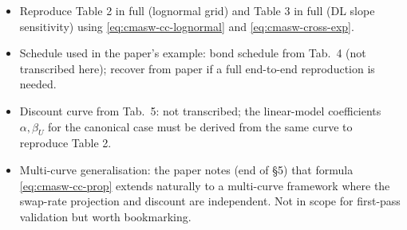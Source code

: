 \documentclass[11pt,a4paper]{article}
\begin{document}
\begin{todobox}
\begin{itemize}[noitemsep]
  \item Reproduce Table 2 in full (lognormal grid) and Table 3 in
        full (DL slope sensitivity) using \eqref{eq:cmasw-cc-lognormal}
        and \eqref{eq:cmasw-cross-exp}.
  \item Schedule used in the paper's example: bond schedule from
        Tab.~4 (not transcribed here); recover from paper if a full
        end-to-end reproduction is needed.
  \item Discount curve from Tab.~5: not transcribed; the linear-model
        coefficients $\alpha, \beta_U$ for the canonical case must
        be derived from the same curve to reproduce Table 2.
  \item Multi-curve generalisation: the paper notes (end of \S5) that
        formula \eqref{eq:cmasw-cc-prop} extends naturally to a
        multi-curve framework where the swap-rate projection and
        discount are independent. Not in scope for first-pass
        validation but worth bookmarking.
\end{itemize}
\end{todobox}
\end{document}
